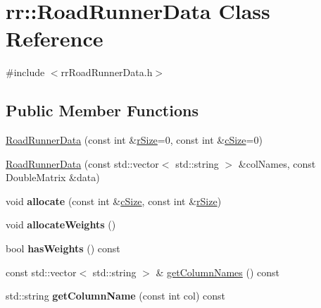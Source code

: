 \hypertarget{classrr_1_1_road_runner_data}{\section{rr\-:\-:Road\-Runner\-Data Class Reference}
\label{classrr_1_1_road_runner_data}
}


{\ttfamily \#include $<$rr\-Road\-Runner\-Data.\-h$>$}

\subsection*{Public Member Functions}
\begin{DoxyCompactItemize}
\item 
\hyperlink{classrr_1_1_road_runner_data_ad4deaa7901ca4fa8d8e4081f8f54ac06}{Road\-Runner\-Data} (const int \&\hyperlink{classrr_1_1_road_runner_data_a41f3e6d0877138b1c0a8879a57dbc82f}{r\-Size}=0, const int \&\hyperlink{classrr_1_1_road_runner_data_ad5bfc0431c7c754b5ed5888aed7abc92}{c\-Size}=0)
\item 
\hyperlink{classrr_1_1_road_runner_data_a08c7c6658f76db5c65871b395848a5b5}{Road\-Runner\-Data} (const std\-::vector$<$ std\-::string $>$ \&col\-Names, const Double\-Matrix \&data)
\item 
\hypertarget{classrr_1_1_road_runner_data_a60938d900741744d793cd974688ed4f7}{void {\bfseries allocate} (const int \&\hyperlink{classrr_1_1_road_runner_data_ad5bfc0431c7c754b5ed5888aed7abc92}{c\-Size}, const int \&\hyperlink{classrr_1_1_road_runner_data_a41f3e6d0877138b1c0a8879a57dbc82f}{r\-Size})}\label{classrr_1_1_road_runner_data_a60938d900741744d793cd974688ed4f7}

\item 
\hypertarget{classrr_1_1_road_runner_data_a7748604c075338816ba419e015b75847}{void {\bfseries allocate\-Weights} ()}\label{classrr_1_1_road_runner_data_a7748604c075338816ba419e015b75847}

\item 
\hypertarget{classrr_1_1_road_runner_data_af803806f34b284f8ae26d58aeea0c3ed}{bool {\bfseries has\-Weights} () const }\label{classrr_1_1_road_runner_data_af803806f34b284f8ae26d58aeea0c3ed}

\item 
const std\-::vector$<$ std\-::string $>$ \& \hyperlink{classrr_1_1_road_runner_data_a0a788753c29c3f13a5c5c25aa2089417}{get\-Column\-Names} () const 
\item 
\hypertarget{classrr_1_1_road_runner_data_a1a6b38f30286aa0597f872abd516cb48}{std\-::string {\bfseries get\-Column\-Name} (const int col) const }\label{classrr_1_1_road_runner_data_a1a6b38f30286aa0597f872abd516cb48}


\end{DoxyCompactItemize}
